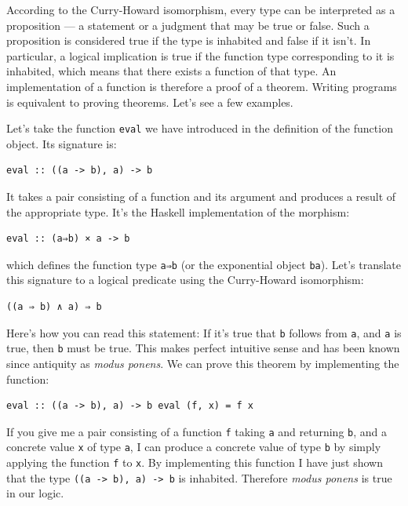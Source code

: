 According to the Curry-Howard isomorphism, every type can be interpreted
as a proposition --- a statement or a judgment that may be true or
false. Such a proposition is considered true if the type is inhabited
and false if it isn't. In particular, a logical implication is true if
the function type corresponding to it is inhabited, which means that
there exists a function of that type. An implementation of a function is
therefore a proof of a theorem. Writing programs is equivalent to
proving theorems. Let's see a few examples.

Let's take the function \texttt{eval} we have introduced in the
definition of the function object. Its signature is:

\begin{verbatim}
eval :: ((a -> b), a) -> b
\end{verbatim}

It takes a pair consisting of a function and its argument and produces a
result of the appropriate type. It's the Haskell implementation of the
morphism:

\begin{verbatim}
eval :: (a⇒b) × a -> b
\end{verbatim}

which defines the function type \texttt{a⇒b} (or the exponential object
\texttt{ba}). Let's translate this signature to a logical predicate
using the Curry-Howard isomorphism:

\begin{verbatim}
((a ⇒ b) ∧ a) ⇒ b
\end{verbatim}

Here's how you can read this statement: If it's true that \texttt{b}
follows from \texttt{a}, and \texttt{a} is true, then \texttt{b} must be
true. This makes perfect intuitive sense and has been known since
antiquity as \emph{modus ponens}. We can prove this theorem by
implementing the function:

\begin{verbatim}
eval :: ((a -> b), a) -> b eval (f, x) = f x
\end{verbatim}

If you give me a pair consisting of a function \texttt{f} taking
\texttt{a} and returning \texttt{b}, and a concrete value \texttt{x} of
type \texttt{a}, I can produce a concrete value of type \texttt{b} by
simply applying the function \texttt{f} to \texttt{x}. By implementing
this function I have just shown that the type
\texttt{((a\ -\textgreater{}\ b),\ a)\ -\textgreater{}\ b} is inhabited.
Therefore \emph{modus ponens} is true in our logic.

